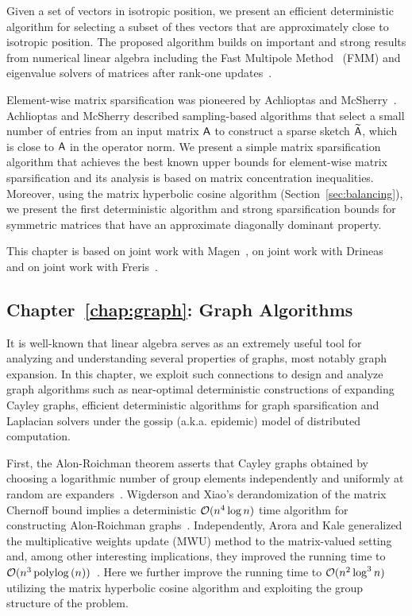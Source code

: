 %
Given a set of vectors in isotropic position, we present an efficient deterministic algorithm for selecting a subset of thes vectors that are approximately close to isotropic position. The proposed algorithm builds on important and strong results from numerical linear algebra including the Fast Multipole Method~\cite{FMM:CGR} (FMM) and eigenvalue solvers of matrices after rank-one updates~\cite{Gu:update}.
%

%
Element-wise matrix sparsification was pioneered by Achlioptas and McSherry~\cite{matrix:sparsification:AM01,matrix:sparsification:optas}. Achlioptas and McSherry described sampling-based algorithms that select a small number of entries from an input matrix ${\mathsf{A} } $ to construct a sparse sketch $\widetilde{{\mathsf{A} }} $, which is close to ${\mathsf{A} }$ in the operator norm. We present a simple matrix sparsification algorithm that achieves the best known upper bounds for element-wise matrix sparsification and its analysis is based on matrix concentration inequalities. Moreover, using the matrix hyperbolic cosine algorithm (Section~\ref{sec:balancing}), we present the first deterministic algorithm and strong sparsification bounds for symmetric matrices that have an approximate diagonally dominant property.
\begin{center}
This chapter is based on joint work with Magen~\cite{chernoff:matrix_valued:MZ11}, on joint work with Drineas~\cite{matrix:sparsification:IPL2011} and on joint work with Freris~\cite{REK}.
\end{center}
%
\subsection*{Chapter~\ref{chap:graph}: Graph Algorithms}
It is well-known that linear algebra serves as an extremely useful tool for analyzing and understanding several properties of graphs, most notably graph expansion. In this chapter, we exploit such connections to design and analyze graph algorithms such as near-optimal deterministic constructions of expanding Cayley graphs, efficient deterministic algorithms for graph sparsification and Laplacian solvers under the gossip (a.k.a. epidemic) model of distributed computation.

%
First, the Alon-Roichman theorem asserts that Cayley graphs obtained by choosing a logarithmic number of group elements independently and uniformly at random are expanders~\cite{expander:AlonRoichman:orig}. Wigderson and Xiao's derandomization of the matrix Chernoff bound implies a deterministic $\mathcal{O}(n^4 \log n )$ time algorithm for constructing Alon-Roichman graphs~\cite{chernoff:matrix_valued:derand:WX08}. Independently, Arora and Kale generalized the multiplicative weights update (MWU) method to the matrix-valued setting and, among other interesting implications, they improved the running time to $\mathcal{O}(n^3\operatorname{polylog}\left(n\right))$~\cite{phdthesis:Kale:2008}. Here we further improve the running time to $\mathcal{O}(n^2 \log^3 n)$ utilizing the matrix hyperbolic cosine algorithm and exploiting the group structure of the problem.
%

